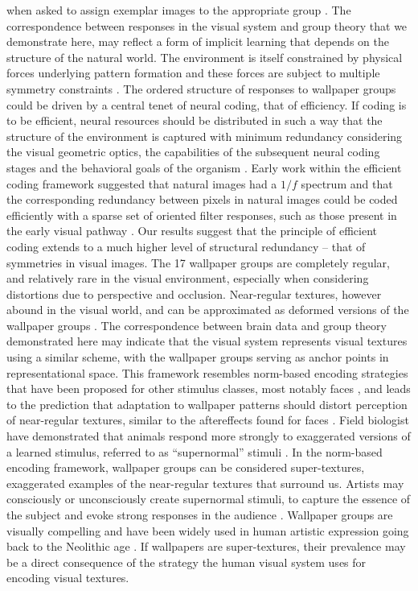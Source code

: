 \documentclass[9pt,twocolumn,twoside,lineno]{pnas-new}
\begin{document}
when asked to assign exemplar images to the appropriate group \cite{RN172}. The correspondence between responses in the visual system and group theory that we demonstrate here, may reflect a form of implicit learning that depends on the structure of the natural world. The environment is itself constrained by physical forces underlying pattern formation and these forces are subject to multiple symmetry constraints \cite{RN1634}. The ordered structure of responses to wallpaper groups could be driven by a central tenet of neural coding, that of efficiency. If coding is to be efficient, neural resources should be distributed in such a way that the structure of the environment is captured with minimum redundancy considering the visual geometric optics, the capabilities of the subsequent neural coding stages and the behavioral goals of the organism \cite{RN1758, RN1760, RN1757, RN1756}. Early work within the efficient coding framework suggested that natural images had a $1/f$ spectrum and that the corresponding redundancy between pixels in natural images could be coded efficiently with a sparse set of oriented filter responses, such as those present in the early visual pathway \cite{RN1740, RN1446}. Our results suggest that the principle of efficient coding extends to a much higher level of structural redundancy – that of symmetries in visual images. The 17 wallpaper groups are completely regular, and relatively rare in the visual environment, especially when considering distortions due to perspective and occlusion. Near-regular textures, however abound in the visual world, and can be approximated as deformed versions of the wallpaper groups \cite{RN1519}. The correspondence between brain data and group theory demonstrated here may indicate that the visual system represents visual textures using a similar scheme, with the wallpaper groups serving as anchor points in representational space. This framework resembles norm-based encoding strategies that have been proposed for other stimulus classes, most notably faces \cite{RN435}, and leads to the prediction that adaptation to wallpaper patterns should distort perception of near-regular textures, similar to the aftereffects found for faces \cite{RN1768}. Field biologist have demonstrated that animals respond more strongly to exaggerated versions of a learned stimulus, referred to as “supernormal” stimuli \cite{RN1775}. In the norm-based encoding framework, wallpaper groups can be considered super-textures, exaggerated examples of the near-regular textures that surround us. Artists may consciously or unconsciously create supernormal stimuli, to capture the essence of the subject and evoke strong responses in the audience \cite{RN1764}. Wallpaper groups are visually compelling and have been widely used in human artistic expression going back to the Neolithic age \cite{RN1949}. If wallpapers are super-textures, their prevalence may be a direct consequence of the strategy the human visual system uses for encoding visual textures. 
\end{document}
